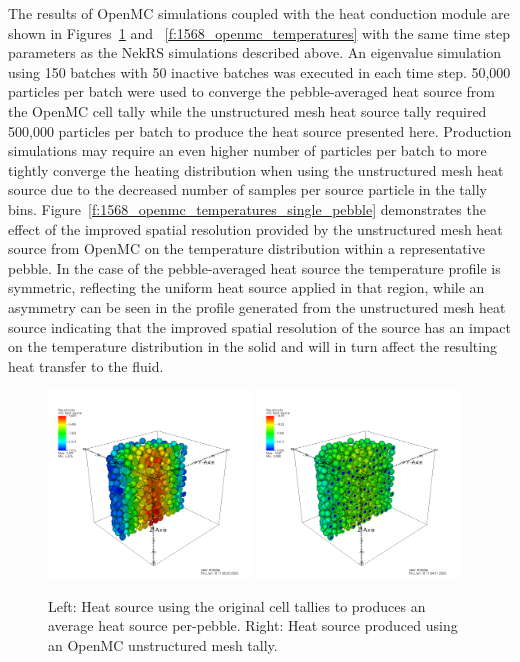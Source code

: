 The results of OpenMC simulations coupled with the heat conduction module are
shown in Figures~\ref{f:1568_openmc_heat_source} and
~\ref{f:1568_openmc_temperatures} with the same time step parameters as the
NekRS simulations described above. An eigenvalue simulation using 150 batches
with 50 inactive batches was executed in each time step. 50,000 particles per
batch were used to converge the pebble-averaged heat source from the OpenMC cell
tally while the unstructured mesh heat source tally required 500,000 particles
per batch to produce the heat source presented here. Production simulations may
require an even higher number of particles per batch to more tightly converge
the heating distribution when using the unstructured mesh heat source due to the
decreased number of samples per source particle in the tally bins.
Figure~\ref{f:1568_openmc_temperatures_single_pebble} demonstrates the effect of
the improved spatial resolution provided by the unstructured mesh heat source
from OpenMC on the temperature distribution within a representative pebble. In
the case of the pebble-averaged heat source the temperature profile is
symmetric, reflecting the uniform heat source applied in that region, while an
asymmetry can be seen in the profile generated from the unstructured mesh heat
source indicating that the improved spatial resolution of the source has an
impact on the temperature distribution in the solid and will in turn affect the
resulting heat transfer to the fluid.

\begin{figure}[!h]
\centering
\includegraphics[clip=true,width=0.48\textwidth]{Figures/openmc_cell_heat_source}
\includegraphics[clip=true,width=0.48\textwidth]{Figures/openmc_mesh_heat_source}
\caption{Left: Heat source using the original cell tallies to produces an average heat source per-pebble. Right: Heat source produced using an OpenMC unstructured mesh tally.}
\label{f:1568_openmc_heat_source}
\end{figure}

